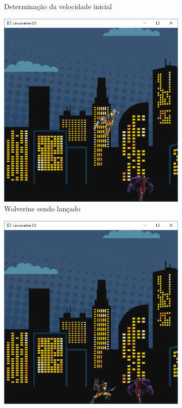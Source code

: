 \begin{enumerate}
\begin{figure}[!htp]
\begin{subfigure}[t]{0.3\textwidth}
        \caption{Determinação da velocidade inicial}
        \label{fig:cap03_ex27b}
    \end{subfigure}
    \hfill
    \begin{subfigure}[t]{0.3\textwidth}
        \centerline{\includegraphics[width=.9\textwidth]{img/cap3_ex27c}}
        \caption{Wolverine sendo lançado}
        \label{fig:cap03_ex27c}
    \end{subfigure}
    \hfill
    \begin{subfigure}[t]{0.3\textwidth}
        \centerline{\includegraphics[width=.9\textwidth]{img/cap3_ex27d}}

\end{subfigure}
\end{figure}
\end{enumerate}
